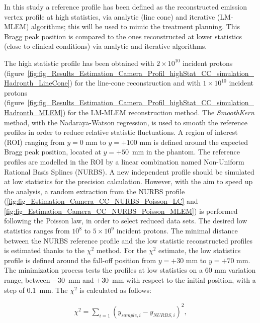 In this study a reference profile has been defined as the reconstructed emission vertex profile at high statistics, via analytic (line cone) and iterative (LM-MLEM) algorithms; this will be used to mimic the treatment planning. This Bragg peak position is compared to the ones reconstructed at lower statistics (close to clinical conditions) via analytic and iterative algorithms.

The high statistic profile has been obtained with $2\times10^{10}$ incident protons (figure~\ref{fig:fig_Results_Estimation_Camera_Profil_highStat_CC_simulation_Hadronth_LineCone}) for the line-cone reconstruction and with $1\times10^{10}$ incident protons (figure~\ref{fig:fig_Results_Estimation_Camera_Profil_highStat_CC_simulation_Hadronth_MLEM}) for the LM-MLEM reconstruction method. The \textit{SmoothKern} method, with the Nadaraya-Watson regression, is used to smooth the reference profiles in order to reduce relative statistic fluctuations.\newline
A region of interest (ROI) ranging from $y=0$ mm to $y=+100$ mm is defined around the expected Bragg peak position, located at $y=+50$~mm in the phantom. The reference profiles are modelled in the ROI by a linear combination named Non-Uniform Rational Basis Splines (NURBS). \newline
A new independent profile should be simulated at low statistics for the precision calculation. However, with the aim to speed up the analysis, a random extraction from the NURBS profile (\ref {fig:fig_Estimation_Camera_CC_NURBS_Poisson_LC} and \ref {fig:fig_Estimation_Camera_CC_NURBS_Poisson_MLEM}) is performed following the Poisson law, in order to select reduced data sets. The desired low statistics ranges from $10^8$ to $5\times10^9$ incident protons.\newline
The minimal distance between the NURBS reference profile and the low statistic reconstructed profiles is estimated thanks to the $\chi^2$ method. For the $\chi^2$ estimate, the low statistics profile is defined around the fall-off position from $y=+30$ mm to $y=+70$ mm. The minimization process tests the profiles at low statistics on a 60 mm variation range, between $-30$~mm and $+30$~mm with respect to the initial position, with a step of $0.1$~mm. The      $\chi^2$ is calculated as follows:

\begin{eqnarray}
\chi^2 = \sum\limits_{i=1} {(y_{sample,i}-y_{NURBS,i})^2},
\end{eqnarray}

